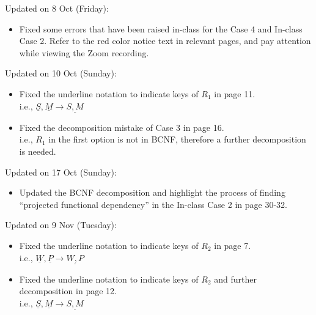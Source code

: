 \begin{frame}
\begin{small}
	Updated on 8 Oct (Friday):
	\begin{itemize}
		\item Fixed some errors that have been raised in-class for the Case 4 and In-class Case 2. Refer to the red color notice text in relevant pages, and pay attention while viewing the Zoom recording. 
	\end{itemize}
	Updated on 10 Oct (Sunday):
	\begin{itemize}
		\item Fixed the underline notation to indicate keys of $R_1$ in page 11.\\
		i.e., $\underline{S},\underline{M} \rightarrow\underline{S,M}$
		\item Fixed the decomposition mistake of Case 3 in page 16.\\
		i.e., $R_1$ in the first option is not in BCNF, therefore a further decomposition is needed. 
	\end{itemize}
	Updated on 17 Oct (Sunday):
	\begin{itemize}
		\item Updated the BCNF decomposition and highlight the process of finding ``projected functional dependency'' in the In-class Case 2 in page 30-32.
	\end{itemize}
	Updated on 9 Nov (Tuesday):
	\begin{itemize}
	\item Fixed the underline notation to indicate keys of $R_2$ in page 7.\\
	i.e., $\underline{W},\underline{P} \rightarrow\underline{W,P}$
	\item Fixed the underline notation to indicate keys of $R_2$ and further decomposition in page 12.\\
	i.e., $\underline{S},\underline{M} \rightarrow\underline{S,M}$
	\end{itemize}
\end{small}
\end{frame}

